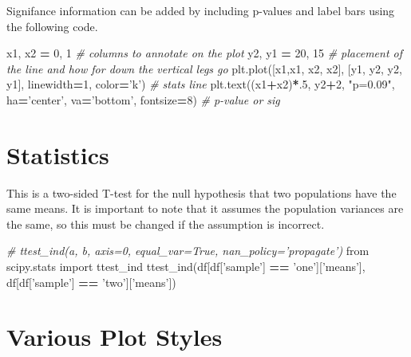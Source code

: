 \documentclass[]{book}
\newenvironment{Shaded}{\begin{snugshade}}{\end{snugshade}}
\newcommand{\DecValTok}[1]{\textcolor[rgb]{0.00,0.00,0.81}{#1}}
\newcommand{\StringTok}[1]{\textcolor[rgb]{0.31,0.60,0.02}{#1}}
\newcommand{\ImportTok}[1]{#1}
\newcommand{\CommentTok}[1]{\textcolor[rgb]{0.56,0.35,0.01}{\textit{#1}}}
\newcommand{\OperatorTok}[1]{\textcolor[rgb]{0.81,0.36,0.00}{\textbf{#1}}}
\newcommand{\NormalTok}[1]{#1}
\begin{document}
Signifance information can be added by including p-values and label bars
using the following code.

\begin{Shaded}
\begin{Highlighting}[]
\NormalTok{x1, x2 }\OperatorTok{=} \DecValTok{0}\NormalTok{, }\DecValTok{1} \CommentTok{# columns to annotate on the plot}
\NormalTok{y2, y1 }\OperatorTok{=} \DecValTok{20}\NormalTok{, }\DecValTok{15} \CommentTok{# placement of the line and how for down the vertical legs go}
\NormalTok{plt.plot([x1,x1, x2, x2], [y1, y2, y2, y1], linewidth}\OperatorTok{=}\DecValTok{1}\NormalTok{, color}\OperatorTok{=}\StringTok{'k'}\NormalTok{) }\CommentTok{# stats line}
\NormalTok{plt.text((x1}\OperatorTok{+}\NormalTok{x2)}\OperatorTok{*}\NormalTok{.}\DecValTok{5}\NormalTok{, y2}\OperatorTok{+}\DecValTok{2}\NormalTok{, }\StringTok{"p=0.09"}\NormalTok{, ha}\OperatorTok{=}\StringTok{'center'}\NormalTok{, va}\OperatorTok{=}\StringTok{'bottom'}\NormalTok{, fontsize}\OperatorTok{=}\DecValTok{8}\NormalTok{) }\CommentTok{# p-value or sig}
\end{Highlighting}
\end{Shaded}

\section{Statistics}\label{statistics}

This is a two-sided T-test for the null hypothesis that two populations
have the same means. It is important to note that it assumes the
population variances are the same, so this must be changed if the
assumption is incorrect.

\begin{Shaded}
\begin{Highlighting}[]
\CommentTok{# ttest_ind(a, b, axis=0, equal_var=True, nan_policy='propagate')}
\ImportTok{from}\NormalTok{ scipy.stats }\ImportTok{import}\NormalTok{ ttest_ind}
\NormalTok{ttest_ind(df[df[}\StringTok{'sample'}\NormalTok{] }\OperatorTok{==} \StringTok{'one'}\NormalTok{][}\StringTok{'means'}\NormalTok{], df[df[}\StringTok{'sample'}\NormalTok{] }\OperatorTok{==} \StringTok{'two'}\NormalTok{][}\StringTok{'means'}\NormalTok{])}
\end{Highlighting}
\end{Shaded}

\section{Various Plot Styles}\label{various-plot-styles}
\end{document}
